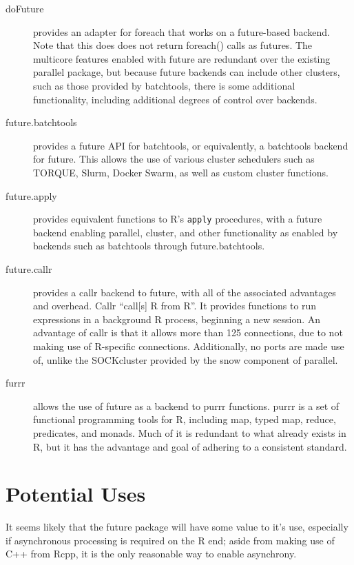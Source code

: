 \documentclass[10pt,a4paper]{article}
\begin{document}
\begin{description}
	\item[doFuture]\cite{bengtsson20do} provides an adapter for
	      foreach\cite{microsoft20} that works on a future-based backend. Note
	      that this does does not return foreach() calls as futures. The
	      multicore features enabled with future are redundant over the
	      existing parallel package, but because future backends can include
	      other clusters, such as those provided by batchtools, there is some
	      additional functionality, including additional degrees of control
	      over backends.
	\item[future.batchtools]\cite{bengtsson19batch} provides a future API
	      for batchtools\cite{lang17}, or equivalently, a batchtools backend
	      for future. This allows the use of various cluster schedulers such
	      as TORQUE, Slurm, Docker Swarm, as well as custom cluster functions.
	\item[future.apply]\cite{bengtsson20apply} provides equivalent
	      functions to R's \texttt{apply} procedures, with a future backend
	      enabling parallel, cluster, and other functionality as enabled by
	      backends such as batchtools through future.batchtools.
	\item[future.callr]\cite{bengtsson19callr} provides a
	      callr\cite{csardi20} backend to future, with all of the associated
	      advantages and overhead. Callr \enquote{call[s] R from R}. It
	      provides functions to run expressions in a background R process,
	      beginning a new session. An advantage of callr is that it allows
	      more than 125 connections, due to not making use of R-specific
	      connections. Additionally, no ports are made use of, unlike the
	      SOCKcluster provided by the snow component of parallel.
	\item[furrr]\cite{vaughan18} allows the use of future as a backend to
	      purrr functions. purrr is a set of functional programming tools for
	      R, including map, typed map, reduce, predicates, and monads. Much of
	      it is redundant to what already exists in R, but it has the
	      advantage and goal of adhering to a consistent standard.
\end{description}

\section{Potential Uses}
\label{sec:potential-uses}

It seems likely that the future package will have some value to it's
use, especially if asynchronous processing is required on the R end;
aside from making use of C++ from Rcpp, it is the only reasonable way
to enable asynchrony.

\printbibliography{}
\end{document}
